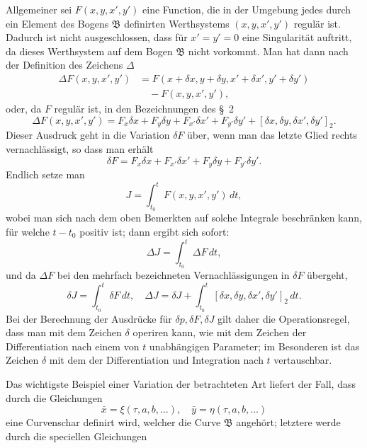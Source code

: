 \documentclass[11pt,a4paper,leqno]{article}
\begin{document}
Allgemeiner sei $F(x,y,x',y')$ eine Function, die in der Umgebung jedes durch ein Element des Bogens $\mathfrak{B}$ definirten Werthsystems $(x,y,x',y')$ regulär ist. Dadurch ist nicht ausgeschlossen, dass für $x'=y'=0$ eine Singularität auftritt, da dieses Werthsystem auf dem Bogen $\mathfrak{B}$ nicht vorkommt. Man hat dann nach der Definition des Zeichens $\Delta$
\[
\begin{aligned}
 \Delta F(x,y,x',y')
 &=F(x+\delta x,y+\delta y,x'+\delta x',y'+\delta y')\\
 &\quad{}-F(x,y,x',y'),
\end{aligned}
\]
oder, da $F$ regulär ist, in den Bezeichnungen des \S~2
\[
 \Delta F(x,y,x',y')
 =F_x\delta x+F_y\delta y+F_{x'}\delta x'+F_{y'}\delta y'
 +[\delta x,\delta y,\delta x',\delta y']_2.
\]
Dieser Ausdruck geht in die Variation $\delta F$ über, wenn man das letzte Glied rechts vernachlässigt, so dass man erhält
\[
 \delta F=F_x\delta x+F_{x'}\delta x'+F_y\delta y+F_{y'}\delta y'.
\]
Endlich setze man
\[
 J=\int_{t_0}^{t} F(x,y,x',y')\,dt,
\]
wobei man sich nach dem oben Bemerkten auf solche Integrale beschränken kann, für welche $t-t_0$ positiv ist; dann ergibt sich sofort:
\[
 \Delta J=\int_{t_0}^{t}\Delta F\,dt,
\]
und da $\Delta F$ bei den mehrfach bezeichneten Vernachlässigungen in $\delta F$ übergeht,
\[
 \delta J=\int_{t_0}^{t}\delta F\,dt,\quad
 \Delta J=\delta J+\int_{t_0}^{t}[\delta x,\delta y,\delta x',\delta y']_2\,dt.
\]
Bei der Berechnung der Ausdrücke für $\delta p,\delta F,\delta J$ gilt daher die Operationsregel, dass man mit dem Zeichen $\delta$ operiren kann, wie mit dem Zeichen der Differentiation nach einem von $t$ unabhängigen Parameter; im Besonderen ist das Zeichen $\delta$ mit dem der Differentiation und Integration nach $t$ vertauschbar.

Das wichtigste Beispiel einer Variation der betrachteten Art liefert der Fall, dass durch die Gleichungen
\begin{equation}\tag{1}
 \bar{x}=\xi(\tau,a,b,\ldots),\quad \bar{y}=\eta(\tau,a,b,\ldots)
\end{equation}
eine Curvenschar definirt wird, welcher die Curve $\mathfrak{B}$ angehört; letztere werde durch die speciellen Gleichungen
\end{document}

